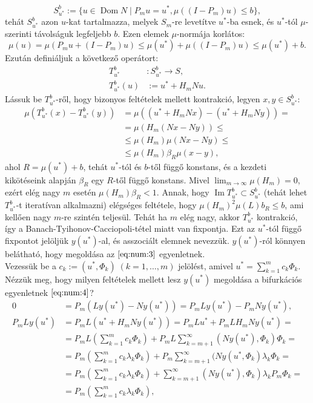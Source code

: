 \documentclass[oneside, titlepage, 12pt, a4paper]{report}
\DeclareMathOperator{\Ima}{Im}	%
\DeclareMathOperator{\Dom}{Dom}	%
\begin{document}
\begin{equation*}
S_{u^*}^b := \{ u \in \Dom N \; | \; P_m u = u^*, \mu((I - P_m)u) \leq b \},
\end{equation*}
tehát $S_{u^*}^b$ azon $u$-kat tartalmazza, melyek $S_m$-re levetítve $u^*$-ba esnek, és $u^*$-tól $\mu$-szerinti távolságuk legfeljebb $b$. Ezen elemek $\mu$-normája korlátos:
\begin{equation*}
\mu(u) = \mu(P_m u + (I - P_m) u) \leq \mu(u^*) + \mu((I - P_m)u) \leq \mu(u^*) + b.
\end{equation*}
 Ezután definiáljuk a következő operátort:
\begin{align*}
T_{u^*}^b &: S_{u^*}^b \rightarrow S, \\
T_{u^*}^b (u) &:= u^* + H_m N u.
\end{align*}
Lássuk be $T_{u^*}^b$-ről, hogy bizonyos feltételek mellett kontrakció, legyen $x, y \in S_{u^*}^b$:
\begin{align*}
\mu( T_{u^*}^b(x) - T_{u^*}^b(y)) &= \mu((u^* + H_m N x) - (u^* + H_m N y)) = \\
&= \mu(H_m(N x - N y)) \leq \\
&\leq \mu(H_m) \mu(N x - N y) \leq \\
&\leq \mu(H_m) \beta_R \mu(x - y),
\end{align*}
ahol $R = \mu(u^*) + b$, tehát $u^*$-tól és $b$-től függő konstans, és a kezdeti kikötéseink alapján $\beta_R$ egy $R$-től függő konstans. Mivel $\lim_{m \to \infty} \mu(H_m) = 0$, ezért elég nagy $m$ esetén $\mu(H_m) \beta_R < 1$. Annak, hogy $\Ima  T_{u^*}^b \subset S_{u^*}^b$ (tehát lehet $ T_{u^*}^b$-t iteratívan alkalmazni) elégséges feltétele, hogy $\mu(H_m)^2 \mu(L) b_R \leq b$, ami kellően nagy $m$-re szintén teljesül. Tehát ha $m$ elég nagy, akkor $ T_{u^*}^b$ kontrakció, így a Banach-Tyihonov-Cacciopoli-tétel miatt van fixpontja. Ezt az $u^*$-tól függő fixpontot jelöljük $y(u^*)$-al, és asszociált elemnek nevezzük. $y(u^*)$-ról könnyen belátható, hogy megoldása az $\eqref{eq:num:3}$ egyenletnek. \\ %
Vezessük be a $c_k := (u^*, \Phi_k) \;(k = 1, \dots, m)$ jelölést, amivel $u^* = \sum_{k = 1}^m c_k \Phi_k$. Nézzük meg, hogy milyen feltételek mellett lesz $y(u^*)$ megoldása a bifurkációs egyenletnek $\eqref{eq:num:4}$?
\begin{align*}
0 &= P_m(L y(u^*) - N y(u^*)) = P_m L y(u^*) - P_m N y(u^*), \\
P_m L y(u^*) &= P_m L (u^* + H_m N y(u^*)) = P_m L u^* + P_m L H_m N y(u^*) = \\
 &= P_m L (\sum_{k = 1}^m c_k\Phi_k) + P_m L \sum_{k = m+1}^\infty (N y(u^*), \Phi_k) \Phi_k = \\
 &= P_m (\sum_{k = 1}^m c_k \lambda_k \Phi_k) + P_m \sum_{k = m + 1}^\infty (N y(u^*, \Phi_k) \lambda_k \Phi_k = \\
 &= P_m (\sum_{k = 1}^m c_k \lambda_k \Phi_k) + \sum_{k = m + 1}^\infty (N y(u^*), \Phi_k) \lambda_k P_m \Phi_k = \\
 &= P_m (\sum_{k = 1}^m c_k \lambda_k \Phi_k),
\end{align*}
\end{document}
